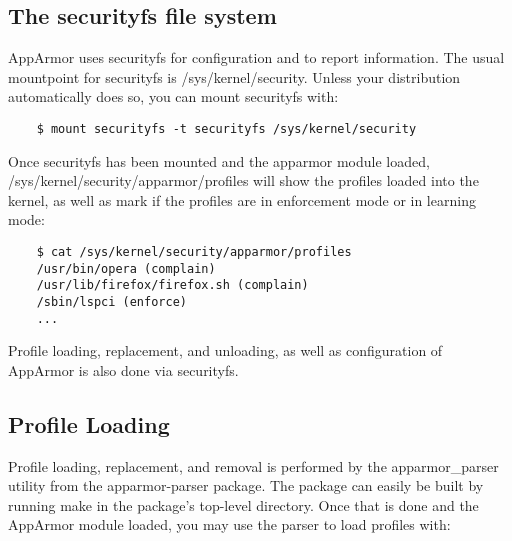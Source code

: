\documentclass[a4paper]{article}
\renewcommand{\H}{\hspace{0pt}}
\begin{document}
\subsection{The securityfs file system}

AppArmor uses securityfs for configuration and to report information.
The usual mountpoint for securityfs is /sys/{\H}kernel/{\H}security.
Unless your distribution automatically does so, you can mount securityfs
with:

\begin{small}
\begin{verbatim}
    $ mount securityfs -t securityfs /sys/kernel/security
\end{verbatim}
\end{small}

Once securityfs has been mounted and the apparmor module loaded,
/sys/{\H}kernel/{\H}security/{\H}apparmor/{\H}profiles will show the
profiles loaded into the kernel, as well as mark if the profiles are in
enforcement mode or in learning mode:

\begin{small}
\begin{verbatim}
    $ cat /sys/kernel/security/apparmor/profiles
    /usr/bin/opera (complain)
    /usr/lib/firefox/firefox.sh (complain)
    /sbin/lspci (enforce)
    ...
\end{verbatim}
\end{small}

Profile loading, replacement, and unloading, as well as configuration of
AppArmor is also done via securityfs.


\subsection{Profile Loading}

Profile loading, replacement, and removal is performed by the
apparmor\_parser utility from the apparmor-parser package. The
package can easily be built by running make in the package's top-level
directory.  Once that is done and the AppArmor module loaded, you may
use the parser to load profiles with:
\end{document}
